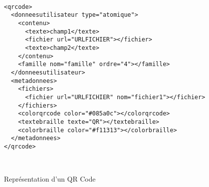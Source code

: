 \begin{figure}[!h]
\begin{adjustbox}{minipage=\textwidth,bgcolor={RGB}{240 240 240}}

\lstset{language=XML}

\begin{lstlisting}

<qrcode>
  <donneesutilisateur type="atomique">
    <contenu>
      <texte>champ1</texte>
      <fichier url="URLFICHIER"></fichier>
      <texte>champ2</texte>
    </contenu>
    <famille nom="famille" ordre="4"></famille>
  </donneesutilisateur>
  <metadonnees>
    <fichiers>
      <fichier url="URLFICHIER" nom="fichier1"></fichier>
    </fichiers>
    <colorqrcode color="#085a0c"></colorqrcode>
    <textebraille texte="QR"></textebraille>
    <colorbraille color="#f11313"></colorbraille>
  </metadonnees>
</qrcode>

 
\end{lstlisting}

\end{adjustbox}
\caption{Représentation d'un QR Code}

\end{figure}\textbf{}